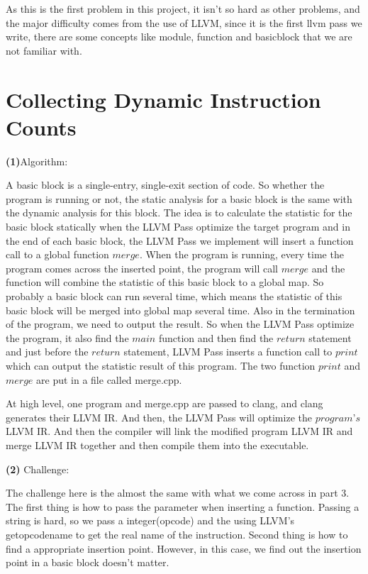 \documentclass{article}
\renewcommand{\part}[1] {\vspace{.10in} {\bf (#1)}}
\begin{document}
As this is the first problem in this project, it isn't so hard as other problems, and the major difficulty comes from the use of LLVM, since it is the first llvm pass we write, there are some concepts like module, function and basicblock that we are not familiar with.




\section{Collecting Dynamic Instruction Counts}

\part{1}Algorithm:

A basic block is a single-entry, single-exit section of code. So whether the program is running or not, the static analysis for a basic block is the same with the dynamic analysis for this block. The idea is to calculate the statistic for the basic block statically when the LLVM Pass optimize the target program and in the end of each basic block, the LLVM Pass we implement will insert a function call to a global function $merge$. When the program is running, every time the program comes across the inserted point, the program will call $merge$ and the function will combine the statistic of this basic block to a global map. So probably a basic block can run several time, which means the statistic of this basic block will be merged into global map several time. Also in the termination of the program, we need to output the result. So when the LLVM Pass optimize the program, it also find the $main$ function and then find the $return$ statement and just before the $return$ statement, LLVM Pass inserts a function call to $print$ which can output the statistic result of this program. The two function $print$ and $merge$ are put in a file called merge.cpp.

At high level, one program and merge.cpp are passed to clang, and clang generates their LLVM IR. And then, the LLVM Pass will optimize the $program$'$s$ LLVM IR. And then the compiler will link the modified program LLVM IR and merge LLVM IR together and then compile them into the executable.


\part{2} Challenge:

The challenge here is the almost the same with what we come across in part 3. The first thing is how to pass the parameter when inserting a function. Passing a string is hard, so we pass a integer(opcode) and the using LLVM's getopcodename to get the real name of the instruction. Second thing is how to find a appropriate insertion point. However, in this case, we find out the insertion point in a basic block doesn't matter.
\end{document}
